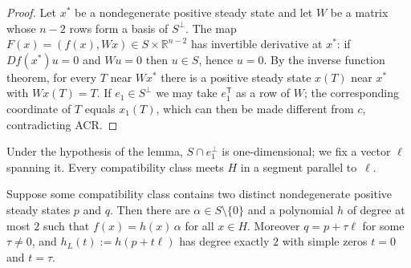 \documentclass[11pt,a4paper]{report}
\providecommand{\R}{\mathbb{R}}
\begin{document}
\begin{proof}
Let $x^*$ be a nondegenerate positive steady state and let $W$ be a matrix whose $n-2$ rows form a basis of
$S^\perp$. The map $F(x)=(f(x),Wx)\in S\times\R^{n-2}$ has invertible derivative at $x^*$: if $Df(x^*)u=0$ and
$Wu=0$ then $u\in S$, hence $u=0$. By the inverse function theorem, for every $T$ near $Wx^*$ there is a positive
steady state $x(T)$ near $x^*$ with $Wx(T)=T$. If $e_1\in S^\perp$ we may take $e_1^{\mathsf T}$ as a row of $W$; the
corresponding coordinate of $T$ equals $x_1(T)$, which can then be made different from $c$, contradicting ACR.
\end{proof}

Under the hypothesis of the lemma, $S\cap e_1^\perp$ is one-dimensional; we fix a vector $\ell$ spanning it. Every
compatibility class meets $H$ in a segment parallel to~$\ell$.

\begin{lemma}\label{lem:field-on-H}
Suppose some compatibility class contains two distinct nondegenerate positive steady states $p$ and $q$. Then there
are $\alpha\in S\setminus\{0\}$ and a polynomial $h$ of degree at most $2$ such that $f(x)=h(x)\,\alpha$ for all
$x\in H$. Moreover $q=p+\tau\ell$ for some $\tau\neq0$, and $h_L(t):=h(p+t\ell)$ has degree exactly $2$ with simple
zeros $t=0$ and $t=\tau$.
\end{lemma}
\end{document}
